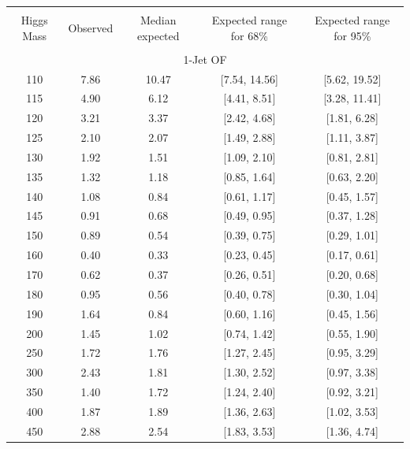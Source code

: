 \begin{table}[hbp!]
\begin{center}
\begin{tabular}{c c c c c  }
\hline
\vspace{-3mm} && \\
 Higgs Mass & Observed  & Median expected & Expected range for 68\% & Expected range for 95\%   \\
\vspace{-3mm} && \\
\hline
\multicolumn{5}{c}{1-Jet OF} \\
\hline
110 & 7.86 & 10.47 & [7.54, 14.56] & [5.62, 19.52] \\
115 & 4.90 & 6.12 & [4.41, 8.51] & [3.28, 11.41] \\
120 & 3.21 & 3.37 & [2.42, 4.68] & [1.81, 6.28] \\
125 & 2.10 & 2.07 & [1.49, 2.88] & [1.11, 3.87] \\
130 & 1.92 & 1.51 & [1.09, 2.10] & [0.81, 2.81] \\
135 & 1.32 & 1.18 & [0.85, 1.64] & [0.63, 2.20] \\
140 & 1.08 & 0.84 & [0.61, 1.17] & [0.45, 1.57] \\
145 & 0.91 & 0.68 & [0.49, 0.95] & [0.37, 1.28] \\
150 & 0.89 & 0.54 & [0.39, 0.75] & [0.29, 1.01] \\
160 & 0.40 & 0.33 & [0.23, 0.45] & [0.17, 0.61] \\
170 & 0.62 & 0.37 & [0.26, 0.51] & [0.20, 0.68] \\
180 & 0.95 & 0.56 & [0.40, 0.78] & [0.30, 1.04] \\
190 & 1.64 & 0.84 & [0.60, 1.16] & [0.45, 1.56] \\
200 & 1.45 & 1.02 & [0.74, 1.42] & [0.55, 1.90] \\
250 & 1.72 & 1.76 & [1.27, 2.45] & [0.95, 3.29] \\
300 & 2.43 & 1.81 & [1.30, 2.52] & [0.97, 3.38] \\
350 & 1.40 & 1.72 & [1.24, 2.40] & [0.92, 3.21] \\
400 & 1.87 & 1.89 & [1.36, 2.63] & [1.02, 3.53] \\
450 & 2.88 & 2.54 & [1.83, 3.53] & [1.36, 4.74] \\

\end{tabular}
\end{center}
\end{table}
